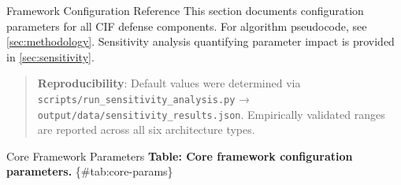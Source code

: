 \documentclass[
  ignorenonframetext,
]{beamer}
\author{\texorpdfstring{}{}}
\date{}
\begin{document}
\begin{frame}
\newpage
\end{frame}

\begin{frame}[fragile]{Framework Configuration Reference}
\protect{}\label{sec:config-params}
This section documents configuration parameters for all CIF defense
components. For algorithm pseudocode, see \cref{sec:methodology}.
Sensitivity analysis quantifying parameter impact is provided in
\cref{sec:sensitivity}.

\begin{quote}
\textbf{Reproducibility}: Default values were determined via
\texttt{scripts/run\_sensitivity\_analysis.py} →
\texttt{output/data/sensitivity\_results.json}. Empirically validated
ranges are reported across all six architecture types.
\end{quote}

\begin{block}{Core Framework Parameters}
\protect{}\label{sec:core-params}
\textbf{Table: Core framework configuration parameters.}
\{\#tab:core-params\}


\end{block}
\end{frame}
\end{document}
